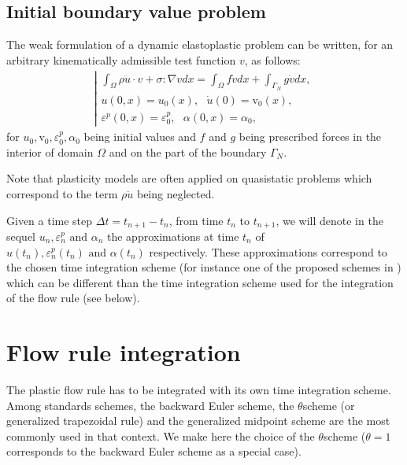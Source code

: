 \documentclass[a4paper,11pt,english]{sphinxmanual}
\begin{document}
\subsection{Initial boundary value problem}
\label{\detokenize{userdoc/model_plasticity_small_strain:initial-boundary-value-problem}}
The weak formulation of a dynamic elastoplastic problem can be written, for an arbitrary kinematically admissible test function \(v\), as follows:
\begin{equation*}
\begin{split}\left| \begin{array}{l}
 \int_{\Omega} \rho \ddot{u}\cdot v + \sigma : \nabla v dx =  \int_{\Omega} f\dot v dx + \int_{\Gamma_N} g\dot v dx, \\
u(0,x) = u_0(x), ~~~\dot{u}(0) = \mathrm{v}_0(x), \\
\varepsilon^p(0,x) = \varepsilon^p_0, ~~~ \alpha(0,x) = \alpha_0,
\end{array} \right.\end{split}
\end{equation*}
for \(u_0, \mathrm{v}_0, \varepsilon^p_0, \alpha_0\) being initial values and \(f\) and \(g\) being prescribed forces in the interior of domain \(\Omega\) and on the part of the boundary \(\Gamma_N\).

Note that plasticity models are often applied on quasi\sphinxhyphen{}static problems which correspond to the term \(\rho \ddot{u}\) being neglected.

Given a time step \(\Delta t = t_{n+1} -t_n\), from time \(t_n\) to \(t_{n+1}\), we will denote in the sequel \(u_n, \varepsilon^p_n  \mbox{ and } \alpha_n\) the approximations at time \(t_n\) of \(u(t_n), \varepsilon^p_n(t_n) \mbox{ and } \alpha(t_n)\) respectively. These approximations correspond to the chosen time integration scheme (for instance one of the proposed schemes in {\hyperref[\detokenize{userdoc/model_time_integration:ud-model-time-integration}]{}}) which can be different than the time integration scheme used for the integration of the flow rule (see below).


\section{Flow rule integration}
\label{\detokenize{userdoc/model_plasticity_small_strain:flow-rule-integration}}
The plastic flow rule has to be integrated with its own time integration scheme. Among standards schemes, the backward Euler scheme, the \(\theta\)\sphinxhyphen{}scheme (or generalized trapezoidal rule) and the generalized mid\sphinxhyphen{}point scheme are the most commonly used in that context. We make here the choice of the \(\theta\)\sphinxhyphen{}scheme (\(\theta = 1\) corresponds to the backward Euler scheme as a special case).
\end{document}
